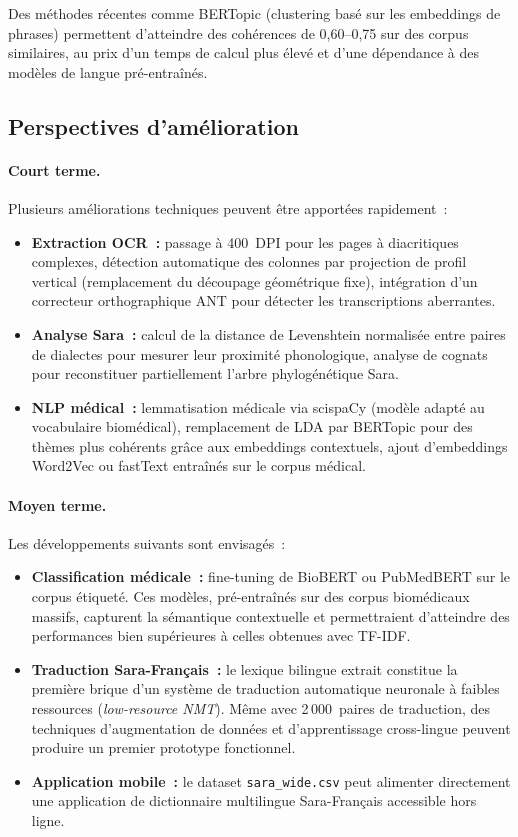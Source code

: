 \documentclass[11pt, a4paper, oneside]{article}
\begin{document}
Des méthodes récentes comme BERTopic (clustering basé sur les embeddings de phrases) permettent d'atteindre des cohérences de 0,60--0,75 sur des corpus similaires, au prix d'un temps de calcul plus élevé et d'une dépendance à des modèles de langue pré-entraînés.

\subsection{Perspectives d'amélioration}

\paragraph{Court terme.} Plusieurs améliorations techniques peuvent être apportées rapidement~:
\begin{itemize}[noitemsep]
  \item \textbf{Extraction OCR~:} passage à 400~DPI pour les pages à diacritiques complexes, détection automatique des colonnes par projection de profil vertical (remplacement du découpage géométrique fixe), intégration d'un correcteur orthographique ANT pour détecter les transcriptions aberrantes.
  \item \textbf{Analyse Sara~:} calcul de la distance de Levenshtein normalisée entre paires de dialectes pour mesurer leur proximité phonologique, analyse de cognats pour reconstituer partiellement l'arbre phylogénétique Sara.
  \item \textbf{NLP médical~:} lemmatisation médicale via scispaCy (modèle adapté au vocabulaire biomédical), remplacement de LDA par BERTopic pour des thèmes plus cohérents grâce aux embeddings contextuels, ajout d'embeddings Word2Vec ou fastText entraînés sur le corpus médical.
\end{itemize}

\paragraph{Moyen terme.} Les développements suivants sont envisagés~:
\begin{itemize}[noitemsep]
  \item \textbf{Classification médicale~:} fine-tuning de BioBERT ou PubMedBERT sur le corpus étiqueté. Ces modèles, pré-entraînés sur des corpus biomédicaux massifs, capturent la sémantique contextuelle et permettraient d'atteindre des performances bien supérieures à celles obtenues avec TF-IDF.
  \item \textbf{Traduction Sara-Français~:} le lexique bilingue extrait constitue la première brique d'un système de traduction automatique neuronale à faibles ressources (\emph{low-resource NMT}). Même avec 2\,000~paires de traduction, des techniques d'augmentation de données et d'apprentissage cross-lingue peuvent produire un premier prototype fonctionnel.
  \item \textbf{Application mobile~:} le dataset \texttt{sara\_wide.csv} peut alimenter directement une application de dictionnaire multilingue Sara-Français accessible hors ligne.
\end{itemize}
\end{document}
